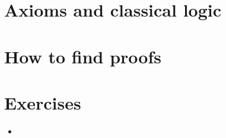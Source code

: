 \documentclass{beamer}
\begin{document}
\section{Axioms and classical logic}


\section{How to find proofs}

\section{Exercises}

\begin{frame}{}
\begin{itemize}
	\item 
\end{itemize}
\end{frame}
\end{document}
